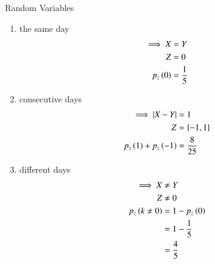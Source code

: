 \documentclass[journal,12pt,onecolumn]{IEEEtran}
\theoremstyle{remark}
\begin{document}
\begin{table}[!ht]                             
  
\caption{Random Variables}
\end{table}
\begin{enumerate}[label=(\roman*)]
	\item the same day
	\begin{align}
	\implies X &= Y\\
	Z &= 0\\
	p_z\left(0\right) &= \frac{1}{5}
	\end{align}
	\item consecutive days
	\begin{align}
	\implies \left\vert X - Y\right\vert &= 1\\
	Z &= \left\{-1,1\right\}\\
	p_z\left(1\right) + p_z\left(-1\right) &= \frac{8}{25}
	\end{align}
	\item different days
	\begin{align}
	\implies X &\neq Y\\
	Z &\neq 0 \\
	p_z\left(k \neq 0\right) &= 1 - p_z\left(0\right)\\
	&= 1 - \frac{1}{5}\\
	&= \frac{4}{5}
	\end{align}
\end{enumerate}

%		




\end{document}
